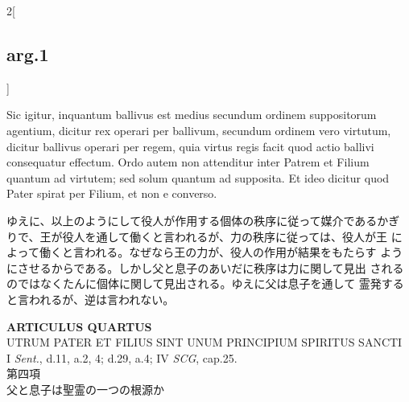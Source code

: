 \documentclass[paper=a4paper,fontsize=10pt,jafontsize=9pt,titlepage]{jlreq}
\begin{document}
\begin{paracol}{2}[\subsection{arg.1}]
\switchcolumn*

Sic igitur, inquantum
ballivus est medius secundum ordinem suppositorum agentium, dicitur
rex operari per ballivum, secundum ordinem vero virtutum, dicitur
ballivus operari per regem, quia virtus regis facit quod actio ballivi
consequatur effectum. Ordo autem non attenditur inter Patrem et Filium
quantum ad virtutem; sed solum quantum ad supposita. Et ideo dicitur
quod Pater spirat per Filium, et non e converso.

\switchcolumn

ゆえに、以上のようにして役人が作用する個体の秩序に従って媒介であるかぎ
 りで、王が役人を通して働くと言われるが、力の秩序に従っては、役人が王
 によって働くと言われる。なぜなら王の力が、役人の作用が結果をもたらす
 ようにさせるからである。しかし父と息子のあいだに秩序は力に関して見出
 されるのではなくたんに個体に関して見出される。ゆえに父は息子を通して
 霊発すると言われるが、逆は言われない。

\end{paracol}
\newpage

\begin{center}
{\Large {\bfseries ARTICULUS QUARTUS}}\\
{\large UTRUM PATER ET FILIUS SINT UNUM PRINCIPIUM SPIRITUS SANCTI}\\
{\footnotesize I {\itshape Sent.}, d.11, a.2, 4; d.29, a.4; IV
 {\itshape SCG}, cap.25.}\\
{\Large 第四項\\父と息子は聖霊の一つの根源か}
\end{center}


{}
\setcounter{section}{4}
\setcounter{subsection}{0}
\end{document}
